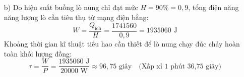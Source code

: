 \begin{ex}
{\begin{enumerate}
\begin{itemize}
				$$Q_2 = m \cdot \lambda = 3 \cdot 1,80 \cdot 10^5 = 540000\text{ J}$$
			\end{itemize}
			Tổng lượng nhiệt lượng có ích tối thiểu cần thiết cung cấp cho khối lượng đồng đạt trị số bằng:
			$$Q_{\text{ích}} = Q_1 + Q_2 = 1201560 + 540000 = 1741560\text{ J}$$
			\item[b)] Do hiệu suất buồng lò nung chỉ đạt mức $H = 90\% = 0,9$, tổng điện năng năng lượng lò cần tiêu thụ từ mạng điện bằng:
			$$W = \frac{Q_{\text{ích}}}{H} = \frac{1741560}{0,9} = 1935060\text{ J}$$
			Khoảng thời gian kĩ thuật tiêu hao cần thiết để lò nung chạy đúc chảy hoàn toàn khối lượng đồng:
			$$\tau = \frac{W}{P} = \frac{1935060\text{ J}}{20000\text{ W}} \approx 96,75\text{ giây} \quad \text{(Xấp xỉ 1 phút 36,75 giây)}$$
		\end{enumerate}
	}
\end{ex}

